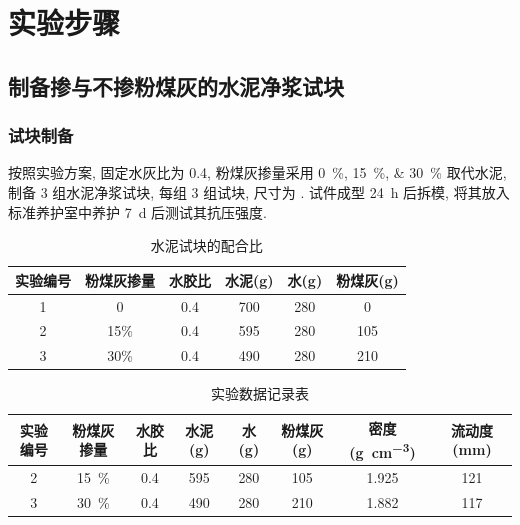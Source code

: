 
\section{实验步骤}

\subsection{制备掺与不掺粉煤灰的水泥净浆试块}

\subsubsection{试块制备}
按照实验方案, 固定水灰比为 \num{0.4}, 粉煤灰掺量采用 \qtylist{0; 15; 30}{\percent} 取代水泥, 制备 3 组水泥净浆试块, 每组 3 组试块, 尺寸为 .
试件成型 \SI{24}{\hour} 后拆模, 将其放入标准养护室中养护 \SI{7}{\day} 后测试其抗压强度.

\begin{table}
  \centering
  \caption{水泥试块的配合比}
  \begin{tabular}{|c|c|c|c|c|c|}
    \hline
    实验编号 & 粉煤灰掺量 & 水胶比 & 水泥(g) & 水(g) & 粉煤灰(g) \\ \hline
    1        & 0          & 0.4    & 700     & 280   & 0         \\ \hline
    2        & 15\%       & 0.4    & 595     & 280   & 105       \\ \hline
    3        & 30\%       & 0.4    & 490     & 280   & 210       \\ \hline
  \end{tabular}

\end{table}


\begin{table}
  \centering
  \caption{实验数据记录表}
  \begin{tabular}{cccccccc}
    \toprule
    实验编号 & 粉煤灰掺量        & 水胶比    & 水泥 (\unit{\gram}) & 水 (\unit{\gram}) & 粉煤灰 (\unit{\gram}) & 密度 (\unit{\gram\per\centi\meter\cubed}) & 流动度 (\unit{\milli\meter}) \\
    \midrule
    2        & \SI{15}{\percent} & \num{0.4} & \num{595}           & \num{280}         & \num{105}             & \num{1.925}                               & \num{121}                    \\
    3        & \SI{30}{\percent} & \num{0.4} & \num{490}           & \num{280}         & \num{210}             & \num{1.882}                               & \num{117}                    \\
    \bottomrule
  \end{tabular}
\end{table}

